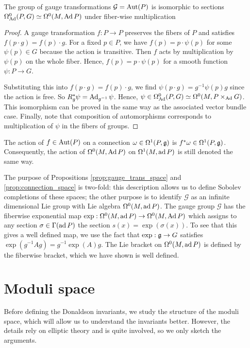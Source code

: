 \begin{prop} \label{prop:gauge_trans_space} %
	The group of gauge transformations $\mathcal{G}=\operatorname{Aut}(P)$ is isomorphic to 
	sections $\Omega_{\operatorname{Ad}}^0(P,G)\simeq \Omega^0(M,\operatorname{Ad} P)$ under fiber-wise 
	multiplication 
\end{prop}
\begin{proof}
	A gauge transformation $f : P \to P$ preserves the fibers of  $P$ and
	satisfies  $f(p\cdot g) = f(p) \cdot g$. For a fixed $p\in P$, we have 
	$f(p) = p\cdot \psi(p)$ for some $\psi(p)\in G$ because the action is
	transitive. Then $f$ acts by multiplication 
	by $\psi(p)$ on the whole fiber. Hence, $f(p) =
	p\cdot \psi(p)$ for a smooth function  $\psi : P \to G$. 

	Substituting this into $f(p\cdot g) = f(p)\cdot g$, we find  $\psi(p\cdot g)
	= g^{-1}\psi(p) g$ since the action is free. So $R_g^*\psi =
	\operatorname{Ad}_{g^{-1}}\psi$. Hence, $\psi \in \Omega^0_{\operatorname{Ad}}(P,G) \simeq
	\Omega^0(M,P\times_{\operatorname{Ad}}G)$. This isomorphism can be proved in the same way
	as the associated vector bundle case.
	Finally, note that composition of automorphisms corresponds to
	multiplication of $\psi$ in the fibers of groups. 
\end{proof}
The action of $f \in \operatorname{Aut}(P)$ on a connection  $\omega\in \Omega^1(P,\operatorname{\mathfrak{g}})$ is
$f^*\omega \in \Omega^1(P,\operatorname{\mathfrak{g}})$. Consequently, the action of $\Omega^0(M,\operatorname{Ad}
P)$ on  $\Omega^1(M,\operatorname{ad} P)$ is still denoted the same way.

The purpose of Propositions \ref{prop:gauge_trans_space} and
\ref{prop:connection_space} is two-fold: this description allows us to 
define Sobolev completions of these spaces; the other 
purpose is to identify $\mathcal{G}$ as an infinite dimensional Lie group with 
Lie algebra $\Omega^0(M,\operatorname{ad} P)$.
The gauge group $\mathcal{G}$ has  
the fiberwise exponential map $\exp : \Omega^0(M,\operatorname{ad} P) \to
\Omega^0(M,\operatorname{Ad} P)$ which assigns to any section  $\sigma \in \Gamma(\operatorname{ad} P)$ the
section  $s(x)=\exp(\sigma(x))$. To see that this gives a well defined map, we
use the fact that  $\exp : \operatorname{\mathfrak{g}} \to G$ satisfies
$\exp(g^{-1}Ag)=g^{-1}\exp(A)g$. The Lie bracket on $\Omega^0(M,\operatorname{ad} P)$ is
defined by the fiberwise bracket, which we have shown is well defined. 
 

\section{Moduli space}
Before defining the Donaldson invariants, we study the structure of the moduli 
space, which will allow us to understand the invariants better. However, the details
rely on elliptic theory and is quite involved, so we only sketch the arguments.

